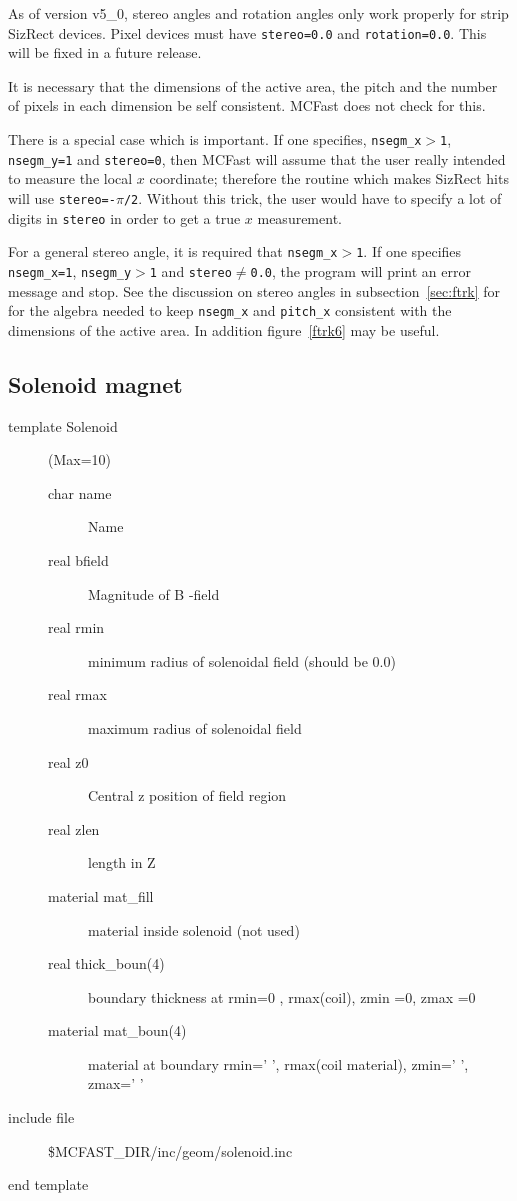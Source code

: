 As of version v5\_0, stereo angles and rotation angles only
work properly for strip SizRect devices.  Pixel devices must
have {\tt stereo=0.0} and {\tt rotation=0.0}.  This will
be fixed in a future release.

It is necessary that 
the dimensions of the active area, the pitch and the number of
pixels in each dimension be self consistent.  MCFast does not
check for this.

There is a special case which is important.  If one specifies, 
{\tt nsegm\_x$>$1}, {\tt nsegm\_y=1} and {\tt stereo=0}, then
MCFast will assume that the user really intended to measure
the local $x$ coordinate; therefore the routine which makes
SizRect hits will use {\tt stereo=-$\pi$/2}.
Without this trick, the user would have to specify a lot of digits in 
{\tt stereo} in order to get a true $x$ measurement.

For a general stereo angle, 
it is required that {\tt nsegm\_x$>$1}.  If one specifies
{\tt nsegm\_x=1}, {\tt nsegm\_y$>$1} and {\tt stereo$\ne$0.0},
the program will print an error message and stop.
See the discussion on stereo angles in subsection~\ref{sec:ftrk}
for for the algebra needed to keep 
{\tt nsegm\_x} and {\tt pitch\_x} consistent with the dimensions
of the active area.  In addition figure~\ref{ftrk6} may be useful.


\filbreak


\subsection{Solenoid magnet}
\begin{description}
\item[{\rm template} Solenoid](Max=10)
\begin{description}
\item[{\rm char} name]    Name
\item[{\rm real} bfield]  Magnitude of B -field
\item[{\rm  real} rmin]   minimum radius of solenoidal field (should be 0.0)
\item[{\rm  real} rmax]   maximum radius of solenoidal field
\item[{\rm  real} z0]     Central z position of field region
\item[{\rm  real} zlen]   length in Z
\item[{\rm  material} mat\_fill]  material inside solenoid (not used)
\item[{\rm  real} thick\_boun(4)]    boundary thickness at rmin=0 , rmax(coil), zmin =0, zmax =0  
\item[{\rm  material} mat\_boun(4)]  material at boundary  rmin=' ', rmax(coil material), zmin=' ', zmax=' '
\end{description}
\item[include file] \$MCFAST\_DIR/inc/geom/solenoid.inc 
\item[end template]
\end{description}



